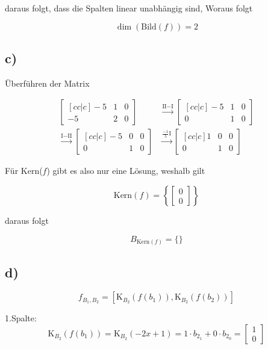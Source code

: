 \documentclass[a4paper, 11pt]{article}
\begin{document}
daraus folgt, dass die Spalten linear unabhängig sind, Woraus folgt

$$ \dim(\text{Bild}(f)) = 2 $$

\subsection{c)}
\label{sec:orgcfe6267}
Überführen der Matrix

\begin{align*}
    \begin{bmatrix}[cc|c]
        -5 & 1 & 0 \\
        -5 & 2 & 0
    \end{bmatrix}
    &\xrightarrow{\text{II} - \text{I}}
    \begin{bmatrix}[cc|c]
        -5 & 1 & 0 \\
        0 & 1 & 0
    \end{bmatrix} \\
    \xrightarrow{\text{I} - \text{II}}
    \begin{bmatrix}[cc|c]
        -5 & 0 & 0 \\
        0 & 1 & 0
    \end{bmatrix}
    &\xrightarrow{ \frac{-1}{5}\text{I}}
    \begin{bmatrix}[cc|c]
        1 & 0 & 0 \\
        0 & 1 & 0
    \end{bmatrix}
\end{align*}

Für Kern(\(f\)) gibt es also nur eine Lösung, weshalb gilt

$$ \text{Kern}(f) = \left\{ \begin{bmatrix} 0 \\ 0 \end{bmatrix} \right\} $$

daraus folgt

$$ B_{\text{Kern}(f)} = \{\} $$

\subsection{d)}
\label{sec:orgf380e64}
$$ f_{B_1,B_2} = \left[\text{K}_{B_2}(f(b_1)), \text{K}_{B_2}(f(b_2))\right]$$

1.Spalte:
$$ \text{K}_{B_2}(f(b_1)) = \text{K}_{B_2}(- 2x + 1) = 1 \cdot b_{2_1} + 0 \cdot b_{2_0} = \begin{bmatrix} 1 \\ 0 \end{bmatrix}$$
\end{document}
